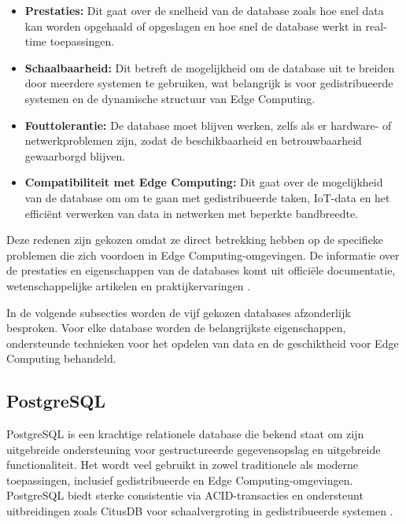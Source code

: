 \begin{itemize} 
    \item \textbf{Prestaties:} Dit gaat over de snelheid van de database zoals hoe snel data kan worden opgehaald of opgeslagen en hoe snel de database werkt in real-time toepassingen. 
    \item \textbf{Schaalbaarheid:} Dit betreft de mogelijkheid om de database uit te breiden door meerdere systemen te gebruiken, wat belangrijk is voor gedistribueerde systemen en de dynamische structuur van Edge Computing. 
    \item \textbf{Fouttolerantie:} De database moet blijven werken, zelfs als er hardware- of netwerkproblemen zijn, zodat de beschikbaarheid en betrouwbaarheid gewaarborgd blijven. 
    \item \textbf{Compatibiliteit met Edge Computing:} Dit gaat over de mogelijkheid van de database om om te gaan met gedistribueerde taken, IoT-data en het efficiënt verwerken van data in netwerken met beperkte bandbreedte. 
\end{itemize}

Deze redenen zijn gekozen omdat ze direct betrekking hebben op de specifieke problemen die zich voordoen in Edge Computing-omgevingen. De informatie over de prestaties en eigenschappen van de databases komt uit officiële documentatie, wetenschappelijke artikelen en praktijkervaringen \autocite{PostgreSQLDocumentation, CassandraDocumentation, RedisDocumentation, TimescaleDBDocumentation, MongoDBDocumentation}.

In de volgende subsecties worden de vijf gekozen databases afzonderlijk besproken. Voor elke database worden de belangrijkste eigenschappen, ondersteunde technieken voor het opdelen van data en de geschiktheid voor Edge Computing behandeld.
\subsection{PostgreSQL}

PostgreSQL is een krachtige relationele database die bekend staat om zijn uitgebreide ondersteuning voor gestructureerde gegevensopslag en uitgebreide functionaliteit. Het wordt veel gebruikt in zowel traditionele als moderne toepassingen, inclusief gedistribueerde en Edge Computing-omgevingen. PostgreSQL biedt sterke consistentie via ACID-transacties en ondersteunt uitbreidingen zoals CitusDB voor schaalvergroting in gedistribueerde systemen \autocite{Kleppmann2017, PostgreSQLDocumentation}.

